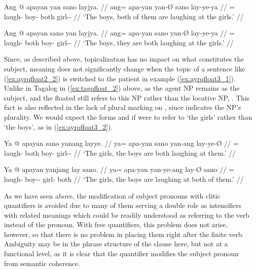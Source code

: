 \pex\label{ex:ayrqfloat2}
\a\label{ex:ayrqfloat2_1}\begingl
	\gla Ang @ apayan yan sano layjya. //
	\glb ang= apa-yan yan-Ø sano lay-ye-ya //
	\glc \AgtT{}= laugh-\TplM{} boy-\Top{} both girl-\Pl{}-\Loc{} //
	\glft `The boys, both of them are laughing at the girls.' //
\endgl

\a\label{ex:ayrqfloat2_2}\begingl
	\gla Ang @ apayan sano yan layjya. //
	\glb ang= apa-yan sano yan-Ø lay-ye-ya //
	\glc \AgtT{}= laugh-\TplM{} both boy-\Top{} girl-\Pl{}-\Loc{} //
	\glft `The boys, they are both laughing at the girls.' //
\endgl

\xe

Since, as described above, topicalization has no impact on what constitutes the
subject, meaning does not significantly change when the topic of a sentence
like (\ref{ex:ayrqfloat2_2}) is switched to the patient in example 
(\ref{ex:ayrqfloat3_1}). Unlike in Tagalog in (\ref{ex:tagqfloat_2}) above,
 as the agent NP remains as the subject, and the
floated  still refers to this NP rather than the locative NP,
. This fact is also reflected in the lack of
plural marking on , since  indicates the
NP's plurality. We would expect the forms  and
 if  were to refer to `the girls' rather than
`the boys', as in (\ref{ex:ayrqfloat3_2}).

\pex\label{ex:ayrqfloat3}
\a\label{ex:ayrqfloat3_1}\begingl
	\gla Ya @ apayan sano yanang layye. //
	\glb ya= apa-yan sano yan-ang lay-ye-Ø //
	\glc \LocT{}= laugh-\TplM{} both boy-\Aarg{} girl-\Pl{}-\Top{} //
	\glft `The girls, the boys are both laughing at them.' //
\endgl

\a\label{ex:ayrqfloat3_2}\begingl
	\gla Ya @ apayan yanjang lay sano. //
	\glb ya= apa-yan yan-ye-ang lay-Ø sano //
	\glc \LocT{}= laugh-\TplM{} boy-\Pl{}-\Aarg{} girl-\Top{} both //
	\glft `The girls, the boys are laughing at both of them.' //
\endgl
\xe

As we have seen above, the modification of subject pronouns with clitic
quantifiers is avoided due to many of them serving a double role as
intensifiers with related meanings which could be readily understood as
referring to the verb instead of the pronoun. With free quantifiers, this
problem does not arise, however, so that there is no problem in placing them
right after the finite verb. Ambiguity may be in the phrase structure of the
clause here, but not at a functional level, as it is clear that the quantifier
modifies the subject pronoun from semantic coherence.

